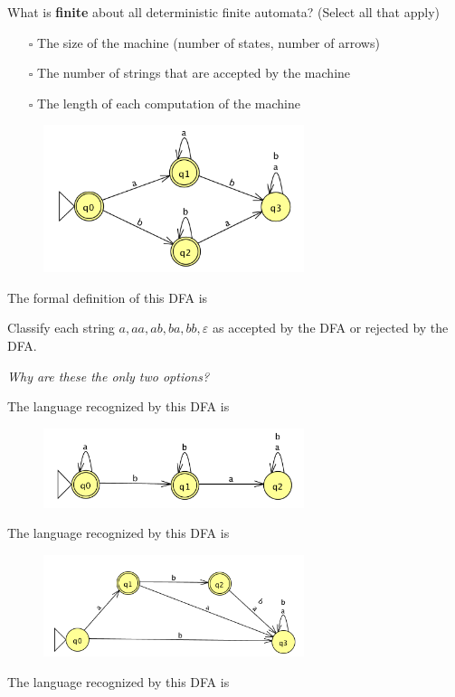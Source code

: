 \documentclass[12pt, oneside]{article}
\begin{document}
What is {\bf finite} about all deterministic finite automata? (Select all that apply)
\begin{itemize}
   \item[$\square$] The size of the machine (number of states, number of arrows)
   \item[$\square$] The number of strings that are accepted by the machine
   \item[$\square$] The length of each computation of the machine
\end{itemize}
  
\begin{figure}[h]
   \centering
   \includegraphics[width=3in]{resources/machines/Lect2DFA1.png} 
\end{figure}
   
The formal definition of this DFA is
   
\vspace{100pt}
   

Classify each string $a, aa, ab, ba, bb, \varepsilon$ as accepted by the DFA or rejected by the DFA.  

{\it Why are these the only two options?}

\vspace{200pt}


The language recognized by this DFA is
  
\vspace{100pt}
   

\begin{figure}[h]
  \centering
  \includegraphics[width=3in]{resources/machines/Lect2DFA2.png} 
\end{figure}
   

The language recognized by this DFA is
  
\vspace{100pt}

\begin{figure}[h]
    \centering
    \includegraphics[width=3in]{resources/machines/Lect2DFA3.png} 
\end{figure}

The language recognized by this DFA is
  
\vspace{100pt}
 \vfill
\end{document}
